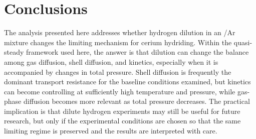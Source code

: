 \documentclass[11pt]{article}
\begin{document}
\section{Conclusions}

The analysis presented here addresses whether hydrogen dilution in an
/Ar mixture changes the limiting mechanism for cerium hydriding. Within
the quasi-steady framework used here, the answer is that dilution can change the
balance among gas diffusion, shell diffusion, and kinetics, especially when it
is accompanied by changes in total pressure. Shell diffusion is frequently the
dominant transport resistance for the baseline conditions examined, but kinetics
can become controlling at sufficiently high temperature and pressure, while
gas-phase diffusion becomes more relevant as total pressure decreases. The
practical implication is that dilute hydrogen experiments may still be useful
for future research, but only if the experimental conditions are chosen so
that the same limiting regime is preserved and the results are interpreted with
care.



\end{document}
